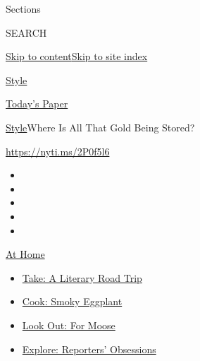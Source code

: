 Sections

SEARCH

\protect\hyperlink{site-content}{Skip to
content}\protect\hyperlink{site-index}{Skip to site index}

\href{https://www.nytimes3xbfgragh.onion/section/style}{Style}

\href{https://myaccount.nytimes3xbfgragh.onion/auth/login?response_type=cookie\&client_id=vi}{}

\href{https://www.nytimes3xbfgragh.onion/section/todayspaper}{Today's
Paper}

\href{/section/style}{Style}\textbar{}Where Is All That Gold Being
Stored?

\url{https://nyti.ms/2P0f5l6}

\begin{itemize}
\item
\item
\item
\item
\item
\end{itemize}

\href{https://www.nytimes3xbfgragh.onion/spotlight/at-home?action=click\&pgtype=Article\&state=default\&region=TOP_BANNER\&context=at_home_menu}{At
Home}

\begin{itemize}
\tightlist
\item
  \href{https://www.nytimes3xbfgragh.onion/2020/07/28/books/time-for-a-literary-road-trip.html?action=click\&pgtype=Article\&state=default\&region=TOP_BANNER\&context=at_home_menu}{Take:
  A Literary Road Trip}
\item
  \href{https://www.nytimes3xbfgragh.onion/2020/07/29/magazine/bored-with-your-home-cooking-some-smoky-eggplant-will-fix-that.html?action=click\&pgtype=Article\&state=default\&region=TOP_BANNER\&context=at_home_menu}{Cook:
  Smoky Eggplant}
\item
  \href{https://www.nytimes3xbfgragh.onion/2020/07/27/travel/moose-michigan-isle-royale.html?action=click\&pgtype=Article\&state=default\&region=TOP_BANNER\&context=at_home_menu}{Look
  Out: For Moose}
\item
  \href{https://www.nytimes3xbfgragh.onion/interactive/2020/at-home/even-more-reporters-editors-diaries-lists-recommendations.html?action=click\&pgtype=Article\&state=default\&region=TOP_BANNER\&context=at_home_menu}{Explore:
  Reporters' Obsessions}
\end{itemize}

